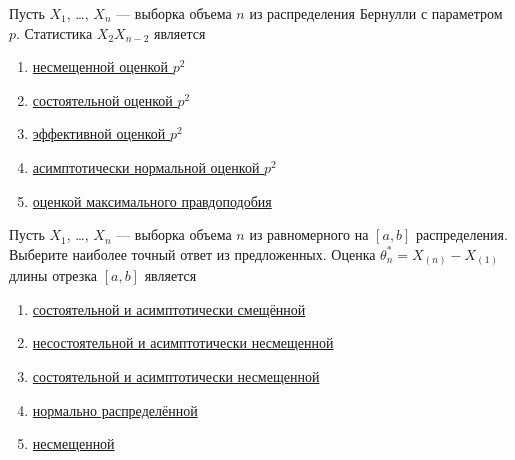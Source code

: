 \documentclass[t]{beamer}
\begin{document}
 \begin{frame} \label{37} 
\begin{block}{37} 

Пусть $X_1$, \ldots, $X_n$ — выборка объема $n$ из распределения Бернулли с параметром $p$. Статистика $X_2 X_{n-2}$ является
 


 \end{block} 
\begin{enumerate} 
\item[] \hyperlink{37-Yes}{\beamergotobutton{} несмещенной оценкой $p^2$}
\item[] \hyperlink{37-No}{\beamergotobutton{} состоятельной оценкой $p^2$}
\item[] \hyperlink{37-No}{\beamergotobutton{} эффективной оценкой $p^2$}
\item[] \hyperlink{37-No}{\beamergotobutton{} асимптотически нормальной оценкой $p^2$}
\item[] \hyperlink{37-No}{\beamergotobutton{} оценкой максимального правдоподобия}
\end{enumerate} 
\end{frame} 


 \begin{frame} \label{38} 
\begin{block}{38} 

Пусть $X_1$, \ldots, $X_n$ — выборка объема $n$ из равномерного на $[a, b]$ распределения. Выберите наиболее точный ответ из предложенных. Оценка $\theta^*_n = X_{(n)}-X_{(1)}$ длины отрезка $[a,b]$ является
 


 \end{block} 
\begin{enumerate} 
\item[] \hyperlink{38-No}{\beamergotobutton{} состоятельной и асимптотически смещённой}
\item[] \hyperlink{38-No}{\beamergotobutton{} несостоятельной и асимптотически несмещенной}
\item[] \hyperlink{38-Yes}{\beamergotobutton{} состоятельной и асимптотически несмещенной}
\item[] \hyperlink{38-No}{\beamergotobutton{} нормально распределённой}
\item[] \hyperlink{38-No}{\beamergotobutton{} несмещенной}
\end{enumerate} 
\end{frame} 
\end{document}
